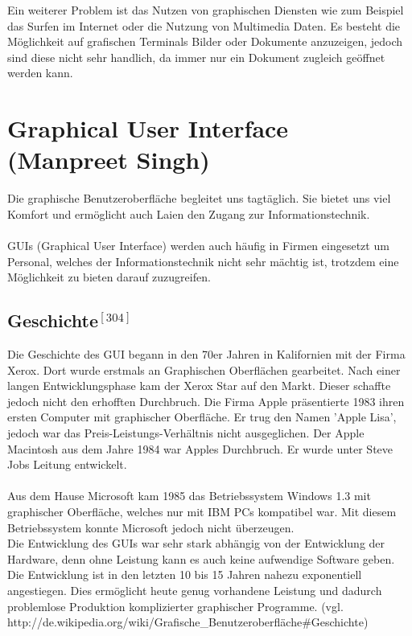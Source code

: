 \documentclass[12pt,a4paper]{report}
\begin{document}
\begin{onehalfspace}
Ein weiterer Problem ist das Nutzen von graphischen Diensten wie zum Beispiel das Surfen im Internet oder die Nutzung von Multimedia Daten. Es besteht die Möglichkeit auf grafischen Terminals Bilder oder Dokumente anzuzeigen, jedoch sind diese nicht sehr handlich, da immer nur ein Dokument zugleich geöffnet werden kann.\\

\newpage
\section{Graphical User Interface (Manpreet Singh)}
Die graphische Benutzeroberfläche begleitet uns tagtäglich. Sie bietet uns viel Komfort und ermöglicht auch Laien den Zugang zur Informationstechnik.\\\\
GUIs (Graphical User Interface) werden auch häufig in Firmen eingesetzt um Personal, welches der Informationstechnik nicht sehr mächtig ist, trotzdem eine Möglichkeit zu bieten darauf zuzugreifen.
\subsection*{Geschichte$^{[304]}$}
Die Geschichte des GUI begann in den 70er Jahren in Kalifornien mit der Firma Xerox. Dort wurde erstmals an Graphischen Oberflächen gearbeitet. Nach einer langen Entwicklungsphase kam der Xerox Star auf den Markt. Dieser schaffte jedoch nicht den erhofften Durchbruch. Die Firma Apple präsentierte 1983 ihren ersten Computer mit graphischer Oberfläche. Er trug den Namen 'Apple Lisa', jedoch war das Preis-Leistungs-Verhältnis nicht ausgeglichen. Der Apple Macintosh aus dem Jahre 1984 war Apples Durchbruch. Er wurde unter Steve Jobs Leitung entwickelt. \\\\
Aus dem Hause Microsoft kam 1985 das Betriebssystem Windows 1.3 mit graphischer Oberfläche, welches nur mit IBM PCs kompatibel war. Mit diesem Betriebssystem konnte Microsoft jedoch nicht überzeugen.\\

Die Entwicklung des GUIs war sehr stark abhängig von der Entwicklung der Hardware, denn ohne Leistung  kann es auch keine aufwendige Software geben.\\

Die Entwicklung  ist in den letzten 10 bis 15 Jahren nahezu exponentiell angestiegen. Dies ermöglicht heute genug vorhandene Leistung und dadurch problemlose Produktion komplizierter graphischer Programme.  (vgl. http://de.wikipedia.org/wiki/Grafische\_Benutzeroberfläche\#Geschichte)


\end{onehalfspace}
\end{document}
